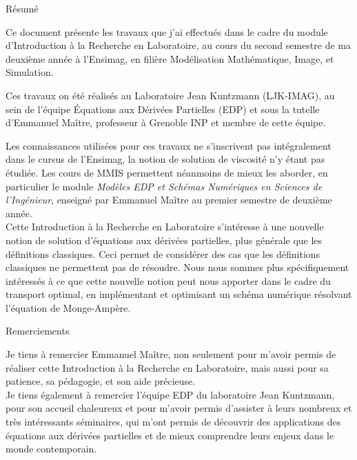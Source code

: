 \documentclass[12pt,a4paper,twoside]{article}
\begin{document}
\newpage

\begin{center}

	{\huge Résumé} \\ 
\end{center}
	\vspace{2cm}

	Ce document présente les travaux que j'ai effectués dans le cadre du module d'Introduction à la Recherche en Laboratoire, au cours du second semestre de ma deuxième année à l'Ensimag, en filière Modélisation Mathématique, Image, et Simulation.

	Ces travaux on été réalisés au Laboratoire Jean Kuntzmann (LJK-IMAG), au sein de l'équipe Équations aux Dérivées Partielles (EDP) et sous la tutelle d'Emmanuel Maître, 
professeur à Grenoble INP et membre de cette équipe.

	Les connaissances utilisées pour ces travaux ne s'inscrivent pas intégralement dans le cursus de l'Ensimag, la notion de solution de viscosité n'y étant pas étudiée.
Les cours de MMIS permettent néanmoins de mieux les aborder, en particulier le module \emph{Modèles EDP et Schémas Numériques en Sciences de l'Ingénieur}, enseigné par Emmanuel Maître au premier semestre de deuxième année. \\

	Cette Introduction à la Recherche en Laboratoire s'intéresse à une nouvelle notion de solution d'équations aux dérivées partielles, plus générale que les définitions classiques. 
Ceci permet de considérer des cas que les définitions classiques ne permettent pas de résoudre. Nous nous sommes plus spécifiquement intéressés à ce que cette nouvelle notion 
peut nous apporter dans le cadre du transport optimal, en implémentant et optimisant un schéma numérique résolvant l'équation de Monge-Ampère.


\newpage

\begin{center}

	{\huge Remerciements} \\ 
\end{center}
	\vspace{2cm}
    Je tiens à remercier Emmanuel Maître, non seulement pour m'avoir permis de réaliser cette Introduction à la Recherche en Laboratoire, mais aussi pour sa patience, sa pédagogie, et son aide précieuse. \\
    

    Je tiens également à remercier l'équipe EDP du laboratoire Jean Kuntzmann, pour son accueil chaleureux et pour m'avoir permis d'assister à leurs nombreux et très intéressants séminaires, qui m'ont permis de découvrir des applications des équations aux dérivées partielles et de mieux comprendre leurs enjeux dans le monde contemporain. \\
    
\end{document}
